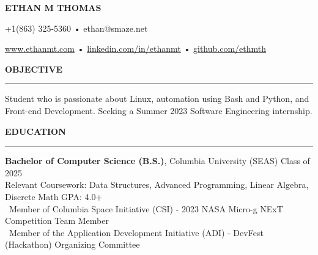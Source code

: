 \documentclass[10pt,letterpaper]{article}
\begin{document}
\begingroup
    \centerline{\MakeUppercase{\LARGE\bf Ethan M Thomas}}
    \medskip
\endgroup

\begingroup
\centerline{+1(863) 325-5360 • ethan@smaze.net}
\endgroup
\par

\begingroup
\centerline{\href{www.ethanmt.com}{www.ethanmt.com} • \href{https://www.linkedin.com/in/ethanmt/}{linkedin.com/in/ethanmt} • \href{https://github.com/ethmth}{github.com/ethmth}}
\endgroup
\par


\medskip
\MakeUppercase{{\bf Objective}} %
\medskip
\hrule %
\begin{list}{}{\setlength{\leftmargin}{0em}}
\item 
    {Student who is passionate about
    Linux, automation using Bash and Python, and Front-end Development. Seeking a Summer 2023 Software Engineering internship.}
\end{list}


\medskip
\MakeUppercase{{\bf Education}} %
\medskip
\hrule %
\begin{list}{}{\setlength{\leftmargin}{0em}}
\item 
{\bf Bachelor of Computer Science (B.S.)}, Columbia University (SEAS) \hfill  {Class of 2025}\\
Relevant Coursework: Data Structures, Advanced Programming, Linear Algebra, Discrete Math \hfill {GPA: 4.0+}
\medskip
\\
\-\ Member of Columbia Space Initiative (CSI) - 2023 NASA Micro-g NExT Competition Team Member \\ 
\-\ Member of the Application Development Initiative (ADI) - DevFest (Hackathon) Organizing Committee
\end{list}


\end{document}
